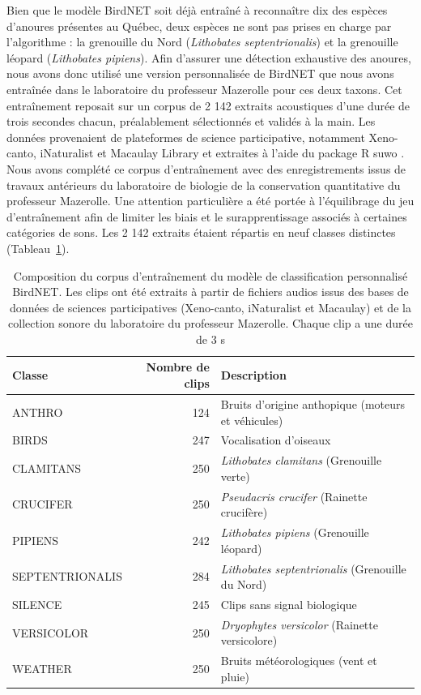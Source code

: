 Bien que le modèle BirdNET soit déjà entraîné à reconnaître dix des espèces d'anoures présentes au Québec, deux espèces ne sont pas prises en charge par l’algorithme : la grenouille du Nord (\emph{Lithobates septentrionalis}) et la grenouille léopard (\emph{Lithobates pipiens}). Afin d’assurer une détection exhaustive des anoures, nous avons donc utilisé une version personnalisée de BirdNET que nous avons entraînée dans le laboratoire du professeur Mazerolle pour ces deux taxons. Cet entraînement reposait sur un corpus de 2 142 extraits acoustiques d’une durée de trois secondes chacun, préalablement sélectionnés et validés à la main. Les données provenaient de plateformes de science participative, notamment Xeno-canto, iNaturalist et Macaulay Library et extraites à l’aide du package R suwo \citep{arya-salas2025suwo}. Nous avons complété ce corpus d'entraînement avec des enregistrements issus de travaux antérieurs du laboratoire de biologie de la conservation quantitative du professeur Mazerolle. Une attention particulière a été portée à l’équilibrage du jeu d’entraînement afin de limiter les biais et le surapprentissage associés à certaines catégories de sons. Les 2 142 extraits étaient répartis en neuf classes distinctes (Tableau~\ref{tab:tab_clips}).

\begin{table}[H]
\centering
\caption{Composition du corpus d'entraînement du modèle de classification personnalisé BirdNET. Les clips ont été extraits à partir de fichiers audios issus des bases de données de sciences participatives (Xeno-canto, iNaturalist et Macaulay) et de la collection sonore du laboratoire du professeur Mazerolle. Chaque clip a une durée de 3 s}
\label{tab:tab_clips}
\begin{tabular}{lrl}
  \hline
Classe & Nombre de clips & Description  \\ 
  \hline
ANTHRO & 124 & Bruits d'origine anthopique (moteurs et véhicules) \\
BIRDS & 247 &  Vocalisation d'oiseaux \\
CLAMITANS & 250 &  \emph{Lithobates clamitans} (Grenouille verte) \\
CRUCIFER & 250 &  \emph{Pseudacris crucifer} (Rainette crucifère) \\
PIPIENS & 242 &  \emph{Lithobates pipiens} (Grenouille léopard) \\
SEPTENTRIONALIS & 284 & \emph{Lithobates septentrionalis} (Grenouille du Nord) \\
SILENCE & 245 &  Clips sans signal biologique \\
VERSICOLOR & 250 & \emph{Dryophytes versicolor} (Rainette versicolore) \\
WEATHER & 250 &  Bruits météorologiques (vent et pluie) \\
     \hline
\end{tabular}
\end{table}

